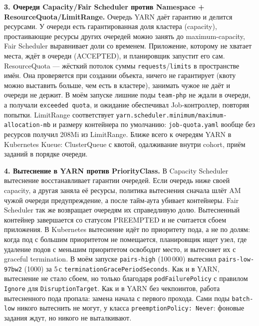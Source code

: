 \documentclass[11pt,a4paper]{article}
\DeclareRobustCommand{\code}[1]{\begingroup\renewcommand{\_}{\textunderscore\allowbreak}\renewcommand{\slash}{/\allowbreak}\texttt{#1}\endgroup}
\begin{document}
\textbf{3. Очереди Capacity/Fair Scheduler против Namespace + ResourceQuota/LimitRange.} Очередь YARN даёт гарантию и делится ресурсами. У очереди есть гарантированная доля кластера (capacity), простаивающие ресурсы других очередей можно занять до maximum-capacity, Fair Scheduler выравнивает доли со временем. Приложение, которому не хватает места, ждёт в очереди (ACCEPTED), и планировщик запустит его сам. ResourceQuota --- жёсткий потолок суммы \code{requests}/\code{limits} в пространстве имён. Она проверяется при создании объекта, ничего не гарантирует (квоту можно выставить больше, чем есть в кластере), занимать чужое не даёт и очереди не держит. В моём запуске лишние поды \code{team-php} не ждали в очереди, а получали \code{exceeded quota}, и ожидание обеспечивал Job-контроллер, повторяя попытки. LimitRange соответствует \code{yarn.scheduler.minimum/maximum-allocation-mb} и размеру контейнера по умолчанию: \code{job-quota.yaml} вообще без ресурсов получил 208Mi из LimitRange. Ближе всего к очередям YARN в Kubernetes Kueue: ClusterQueue с квотой, одалживание внутри cohort, приём заданий в порядке очереди.

\textbf{4. Вытеснение в YARN против PriorityClass.} В Capacity Scheduler вытеснение восстанавливает гарантии очередей. Если очередь ниже своей capacity, а другая заняла её ресурсы, политика вытеснения сначала шлёт AM чужой очереди предупреждение, а после тайм-аута убивает контейнеры. Fair Scheduler так же возвращает очередям их справедливую долю. Вытесненный контейнер завершается со статусом PREEMPTED и не считается сбоем приложения. В Kubernetes вытеснение идёт по приоритету пода, а не по долям: когда под с большим приоритетом не помещается, планировщик ищет узел, где удаление подов с меньшим приоритетом освободит место, и вытесняет их с graceful termination. В моём запуске \code{pairs-high} (100\,000) вытеснил \code{pairs-low-97bw2} (1000) за 5\,с \code{terminationGracePeriodSeconds}. Как и в YARN, вытеснение не стало сбоем, но только благодаря \code{podFailurePolicy} с правилом \code{Ignore} для \code{DisruptionTarget}. Как и в YARN без чекпоинтов, работа вытесненного пода пропала: замена начала с первого прохода. Сами поды \code{batch-low} никого вытеснить не могут, у класса \code{preemptionPolicy: Never}: фоновые задания ждут, но никого не выталкивают.
\end{document}
